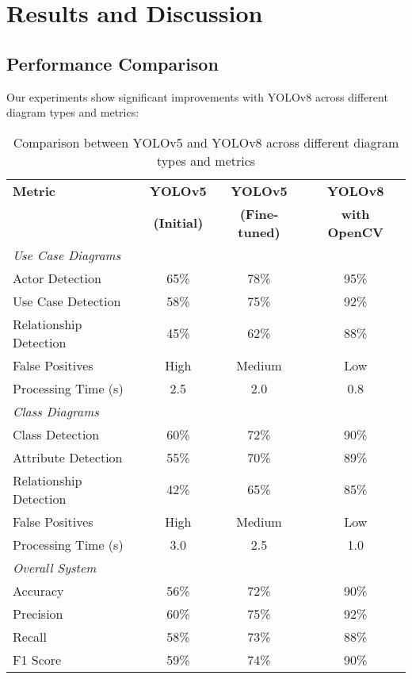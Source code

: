 \documentclass[conference]{IEEEtran}
\begin{document}
\section{Results and Discussion}

\subsection{Performance Comparison}
Our experiments show significant improvements with YOLOv8 across different diagram types and metrics:

\begin{table}[H]
\centering
\caption{Comparison between YOLOv5 and YOLOv8 across different diagram types and metrics}
\label{tab:comparison}
\begin{tabular}{|l|c|c|c|}
\hline
\textbf{Metric} & \textbf{YOLOv5} & \textbf{YOLOv5} & \textbf{YOLOv8} \\
 & \textbf{(Initial)} & \textbf{(Fine-tuned)} & \textbf{with OpenCV} \\
\hline
\multicolumn{4}{|l|}{\textit{Use Case Diagrams}} \\
\hline
Actor Detection & 65\% & 78\% & 95\% \\
Use Case Detection & 58\% & 75\% & 92\% \\
Relationship Detection & 45\% & 62\% & 88\% \\
False Positives & High & Medium & Low \\
Processing Time (s) & 2.5 & 2.0 & 0.8 \\
\hline
\multicolumn{4}{|l|}{\textit{Class Diagrams}} \\
\hline
Class Detection & 60\% & 72\% & 90\% \\
Attribute Detection & 55\% & 70\% & 89\% \\
Relationship Detection & 42\% & 65\% & 85\% \\
False Positives & High & Medium & Low \\
Processing Time (s) & 3.0 & 2.5 & 1.0 \\
\hline
\multicolumn{4}{|l|}{\textit{Overall System}} \\
\hline
Accuracy & 56\% & 72\% & 90\% \\
Precision & 60\% & 75\% & 92\% \\
Recall & 58\% & 73\% & 88\% \\
F1 Score & 59\% & 74\% & 90\% \\
\hline
\end{tabular}
\end{table}
\end{document}

